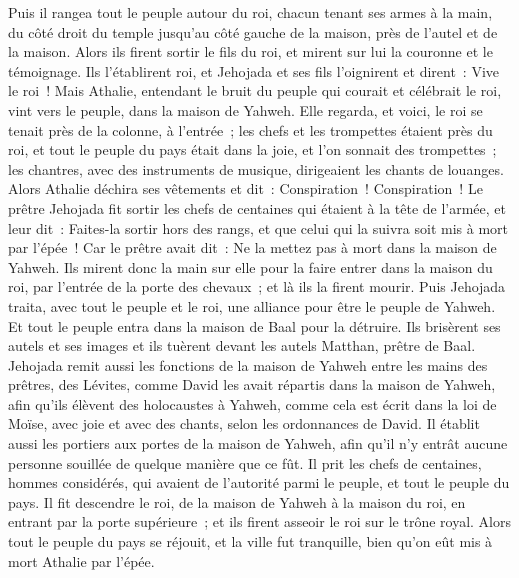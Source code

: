 \begin{multicols}{2}
Puis il rangea tout le peuple autour du roi, chacun tenant ses armes à la main, du côté droit du temple jusqu'au côté gauche de la maison, près de l'autel et de la maison.
Alors ils firent sortir le fils du roi, et mirent sur lui la couronne et le témoignage. Ils l'établirent roi, et Jehojada et ses fils l'oignirent et dirent~: Vive le roi~!
Mais Athalie, entendant le bruit du peuple qui courait et célébrait le roi, vint vers le peuple, dans la maison de Yahweh.
Elle regarda, et voici, le roi se tenait près de la colonne, à l'entrée~; les chefs et les trompettes étaient près du roi, et tout le peuple du pays était dans la joie, et l'on sonnait des trompettes~; les chantres, avec des instruments de musique, dirigeaient les chants de louanges. Alors Athalie déchira ses vêtements et dit~: Conspiration~! Conspiration~!
Le prêtre Jehojada fit sortir les chefs de centaines qui étaient à la tête de l'armée, et leur dit~: Faites-la sortir hors des rangs, et que celui qui la suivra soit mis à mort par l'épée~! Car le prêtre avait dit~: Ne la mettez pas à mort dans la maison de Yahweh.
Ils mirent donc la main sur elle pour la faire entrer dans la maison du roi, par l'entrée de la porte des chevaux~; et là ils la firent mourir.
Puis Jehojada traita, avec tout le peuple et le roi, une alliance pour être le peuple de Yahweh.
Et tout le peuple entra dans la maison de Baal pour la détruire. Ils brisèrent ses autels et ses images et ils tuèrent devant les autels Matthan, prêtre de Baal.
Jehojada remit aussi les fonctions de la maison de Yahweh entre les mains des prêtres, des Lévites, comme David les avait répartis dans la maison de Yahweh, afin qu'ils élèvent des holocaustes à Yahweh, comme cela est écrit dans la loi de Moïse, avec joie et avec des chants, selon les ordonnances de David.
Il établit aussi les portiers aux portes de la maison de Yahweh, afin qu'il n'y entrât aucune personne souillée de quelque manière que ce fût.
Il prit les chefs de centaines, hommes considérés, qui avaient de l'autorité parmi le peuple, et tout le peuple du pays. Il fit descendre le roi, de la maison de Yahweh à la maison du roi, en entrant par la porte supérieure~; et ils firent asseoir le roi sur le trône royal.
Alors tout le peuple du pays se réjouit, et la ville fut tranquille, bien qu'on eût mis à mort Athalie par l'épée.

\end{multicols}
